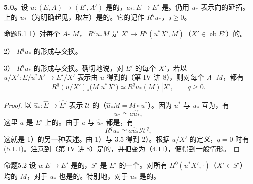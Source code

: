 \textbf{5.0。}设 $u:(E,A)\to(E',A')$ 是的，$u_*:E\to E'$ 是。仍用 $u_*$ 表示向的延拓。上的 $u_*$（为明确起见，取左）是的。它的记作 $R^qu_*$，$q\geq0$。
\begin{SGAresult}{命题}{5.1}
1）对每个 $A$- $M$， $R^qu_*M$ 是 $X'\mapsto H^q(u^*X',M)$（$X'\in\operatorname{ob}E'$）的。

2） $R^qu_*$ 的形成与交换。

3） $R^qu_*$ 的形成与交换。确切地说，对 $E'$ 的每个 $X'$，若以 $u/X':E/u^*X'\to E'/X'$ 表示由 $u$ 得到的（第 IV 讲 8），则对每个 $A$- $M$，都有
\begin{equation}R^q(u/X')_*(M|u^*X')\simeq R^qu_*(M)|X',\qquad q\geq0.\tag{5.1.1}\end{equation}
\end{SGAresult}
\begin{proof}
以 $\widehat u_*:\widehat E\to\widehat {E'}$ 表示 $\mathcal U$-的（$\widehat u_*M=M\circ u^*$）。因为 $u^*$ 与 $u_*$ 互为，有
\[u_*\simeq a\widehat u_*^{\circ},\]
这里 $a$ 是 $E'$ 上的。由于 $a$ 与 $\widehat u_*$ 都是，有
\[R^qu_*\simeq a\widehat u_*\mathscr H^q,\]
这就是 1）的另一种表述。由 1）与 3.5 得到 2）。根据 $u/X'$ 的定义，$q=0$ 时有 (5.1.1)。注意到（第 IV 讲 8）是的，并把变为（4.11），便得到一般情形。
\end{proof}
\begin{SGAresult}{命题}{5.2}
设 $u:E\to E'$ 是的，$S'$ 是 $E'$ 的一个。对所有 $H^0(u^*X',\cdot)$（$X'\in S'$）均的 $M$，对于 $u_*$ 也是的。特别地，对于 $u_*$ 是的。
\end{SGAresult}
